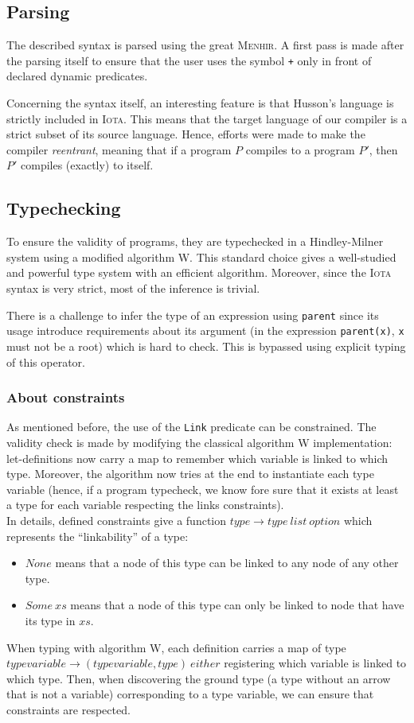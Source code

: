 \documentclass[10pt,a4paper]{article}
\newcommand\Iota{\textsc{Iota}}
\newcommand\Menhir{\textsc{Menhir}}
\newcommand{\ocaml}{\texttt}
\begin{document}
\subsection{Parsing}
The described syntax is parsed using the great \Menhir{}\cite{menhir}. A first pass is made after the parsing itself to ensure that the user uses the symbol \ocaml{+} only in front of declared dynamic predicates.

Concerning the syntax itself, an interesting feature is that Husson's language is strictly included in \Iota{}. This means that the target language of our compiler is a strict subset of its source language. Hence, efforts were made to make the compiler \emph{reentrant}, meaning that if a program $P$ compiles to a program $P'$, then $P'$ compiles (exactly) to itself.

\subsection{Typechecking}
To ensure the validity of programs, they are typechecked in a Hindley-Milner system\cite{hindley} using a modified algorithm W\cite{milner}.
This standard choice gives a well-studied and powerful type system with an efficient algorithm. Moreover, since the \Iota{} syntax is very strict, most of the inference is trivial.

There is a challenge to infer the type of an expression using \ocaml{parent} since its usage introduce requirements about its argument (in the expression \ocaml{parent(x)}, \ocaml{x} must not be a root) which is hard to check. This is bypassed using explicit typing of this operator.

\subsubsection{About constraints}
As mentioned before, the use of the \ocaml{Link} predicate can be constrained. The validity check is made by modifying the classical algorithm W implementation: let-definitions now carry a map to remember which variable is linked to which type. Moreover, the algorithm now tries at the end to instantiate each type variable (hence, if a program typecheck, we know fore sure that it exists at least a type for each variable respecting the links constraints).\\

In details, defined constraints give a function $type \to type\ list\ option$ which represents the ``linkability'' of a type:
\begin{itemize}
\item $None$ means that a node of this type can be linked to any node of any other type.
\item $Some\ xs$ means that a node of this type can only be linked to node that have its type in $xs$.
\end{itemize}
When typing with algorithm W, each definition carries a map of type $typevariable \to (typevariable, type)\ either$ registering which variable is linked to which type. Then, when discovering the ground type (a type without an arrow that is not a variable) corresponding to a type variable, we can ensure that constraints are respected.
\end{document}
